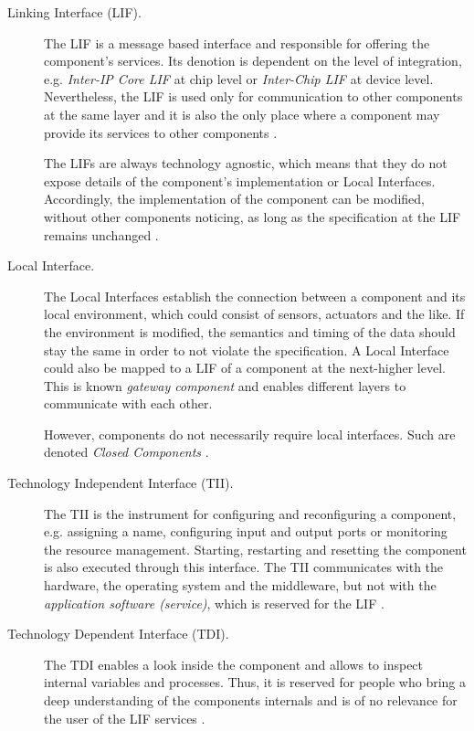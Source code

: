 \begin{description}
\item [Linking Interface (LIF).] 
The LIF is a message based interface and responsible for offering the component's services. Its denotion is dependent on the level of integration, e.g. \emph{Inter-IP Core LIF} at chip level or \emph{Inter-Chip LIF} at device level. Nevertheless, the LIF is used only for communication to other components at the same layer and it is also the only place where a component may provide its services to other components \cite[p.9]{genesys}.

The LIFs are always technology agnostic, which means that they do not expose details of the component's implementation or Local Interfaces. Accordingly, the implementation of the component can be modified, without other components noticing, as long as the specification at the LIF remains unchanged \cite[p.9, 40-41]{genesys}.

\item [Local Interface.] 
The Local Interfaces establish the connection between a component and its local environment, which could consist of sensors, actuators and the like. If the environment is modified, the semantics and timing of the data should stay the same in order to not violate the specification. A Local Interface could also be mapped to a LIF of a component at the next-higher level. This is known \emph{gateway component} and enables different layers to communicate with each other.

However, components do not necessarily require local interfaces. Such are denoted \emph{Closed Components} \cite[p.40-41]{genesys}.

\item [Technology Independent Interface (TII).]
The TII is the instrument for configuring and reconfiguring a component, e.g. assigning a name, configuring input and output ports or monitoring the resource management. Starting, restarting and resetting the component is also executed through this interface. The TII communicates with the hardware, the operating system and the middleware, but not with the \emph{application software (service)}, which is reserved for the LIF \cite[p.40-41]{genesys}.

\item [Technology Dependent Interface (TDI).] 
The TDI enables a look inside the component and allows to inspect internal variables and processes. Thus, it is reserved for people who bring a deep understanding of the components internals and is of no relevance for the user of the LIF services \cite[p.40-41]{genesys}. 
\end{description}

